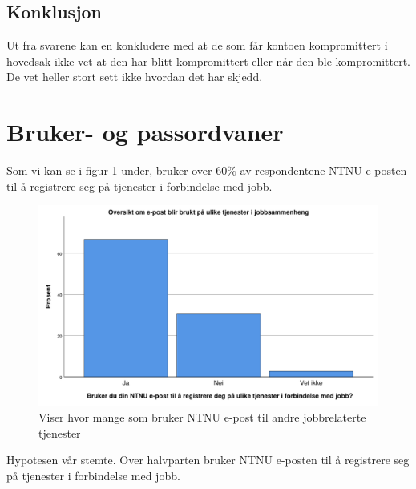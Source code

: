\subsection{Konklusjon}
Ut fra svarene kan en konkludere med at de som får kontoen kompromittert i hovedsak ikke vet at den har blitt kompromittert eller når den ble kompromittert. De vet heller stort sett ikke hvordan det har skjedd. 

\section{Bruker- og passordvaner}

Som vi kan se i figur \ref{fig:epost-jobb} under, bruker over 60\% av respondentene NTNU e-posten til å registrere seg på tjenester i forbindelse med jobb.
\begin{figure}[H]
    \centering
    \includegraphics[scale=0.5]{case_2/bilder/spss/epost_jobb.pdf}
    \caption[epost-jobb]{Viser hvor mange som bruker NTNU e-post til andre jobbrelaterte tjenester}
    \label{fig:epost-jobb}
\end{figure}
Hypotesen vår stemte. Over halvparten bruker NTNU e-posten til å registrere seg på tjenester i forbindelse med jobb. 

